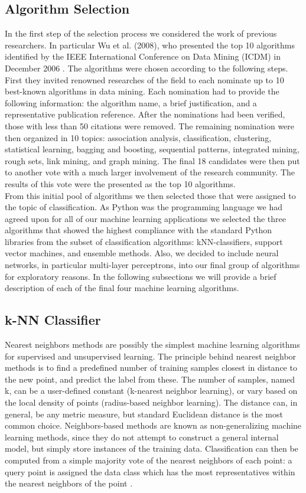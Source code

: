 \subsection{Algorithm Selection}
In the first step of the selection process we considered the work of previous researchers. In particular Wu et al. (2008), who presented the top 10 algorithms identified by the IEEE International Conference on Data Mining (ICDM) in December 2006 \cite{Wu2008}. The algorithms were chosen according to the following steps. First they invited renowned researches of the field to each nominate up to 10 best-known algorithms in data mining. Each nomination had to provide the following information: the algorithm name, a brief justification, and a representative publication reference. After the nominations had been verified, those with less than 50 citations were removed. The remaining nomination were then organized in 10 topics: association analysis, classification, clustering, statistical learning, bagging and boosting, sequential patterns, integrated mining, rough sets, link mining, and graph mining. The final 18 candidates were then put to another vote with a much larger involvement of the research community. The results of this vote were the presented as the top 10 algorithms.\\
From this initial pool of algorithms we then selected those that were assigned to the topic of classification. As Python was the programming language we had agreed upon for all of our machine learning applications we selected the three algorithms that showed the highest compliance with the standard Python libraries from the subset of classification algorithms: kNN-classifiers, support vector machines, and ensemble methods. Also, we decided to include neural networks, in particular multi-layer perceptrons, into our final group of algorithms for exploratory reasons. 
In the following subsections we will provide a brief description of each of the final four machine learning algorithms.

\subsection{k-NN Classifier} 
Nearest neighbors methods are possibly the simplest machine learning algorithms for supervised and unsupervised learning. The principle behind nearest neighbor methods is to find a predefined number of training samples closest in distance to the new point, and predict the label from these. The number of samples, named k, can be a user-defined constant (k-nearest neighbor learning), or vary based on the local density of points (radius-based neighbor learning). The distance can, in general, be any metric measure, but standard Euclidean distance is the most common choice. Neighbors-based methods are known as non-generalizing machine learning methods, since they do not attempt to construct a general internal model, but simply store instances of the training data. Classification can then be computed from a simple majority vote of the nearest neighbors of each point: a query point is assigned the data class which has the most representatives within the nearest neighbors of the point \cite{Pedregosa2011}. 

